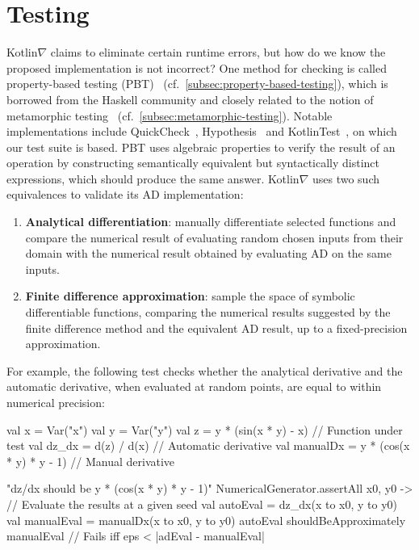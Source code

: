 \documentclass[12pt,initial,twoside,maitrise]{dms}
\numberwithin{equation}{section}
\numberwithin{table}{chapter}
\numberwithin{figure}{chapter}
\begin{document}
\section{Testing}\label{sec:testing}

Kotlin$\nabla$ claims to eliminate certain runtime errors, but how do we know the proposed implementation is not incorrect? One method for checking is called property-based testing (PBT)~\citep{fink1997property} (cf.~\autoref{subsec:property-based-testing}), which is borrowed from the Haskell community and closely related to the notion of metamorphic testing~\citep{chen1998metamorphic} (cf.~\autoref{subsec:metamorphic-testing}). Notable implementations include QuickCheck~\citep{claessen2011quickcheck}, Hypothesis~\citep{Hypothesis} and KotlinTest~\citep{kotlintest}, on which our test suite is based. PBT uses algebraic properties to verify the result of an operation by constructing semantically equivalent but syntactically distinct expressions, which should produce the same answer. Kotlin$\nabla$ uses two such equivalences to validate its AD implementation: \\
%
\begin{enumerate}
    \item \textbf{Analytical differentiation}: manually differentiate selected functions and compare the numerical result of evaluating random chosen inputs from their domain with the numerical result obtained by evaluating AD on the same inputs.
    \item \textbf{Finite difference approximation}: sample the space of symbolic differentiable functions, comparing the numerical results suggested by the finite difference method and the equivalent AD result, up to a fixed-precision approximation. \\
\end{enumerate}
%
For example, the following test checks whether the analytical derivative and the automatic derivative, when evaluated at random points, are equal to within numerical precision:
%
\begin{kotlinlisting}
val x = Var("x")
val y = Var("y")
val z = y * (sin(x * y) - x)            // Function under test
val dz_dx = d(z) / d(x)                 // Automatic derivative
val manualDx = y * (cos(x * y) * y - 1) // Manual derivative

"dz/dx should be y * (cos(x * y) * y - 1)" {
    NumericalGenerator.assertAll { x0, y0 ->
        // Evaluate the results at a given seed
        val autoEval = dz_dx(x to x0, y to y0)
        val manualEval = manualDx(x to x0, y to y0)
        autoEval shouldBeApproximately manualEval // Fails iff eps < |adEval - manualEval|
    }
}
\end{kotlinlisting}
\end{document}
